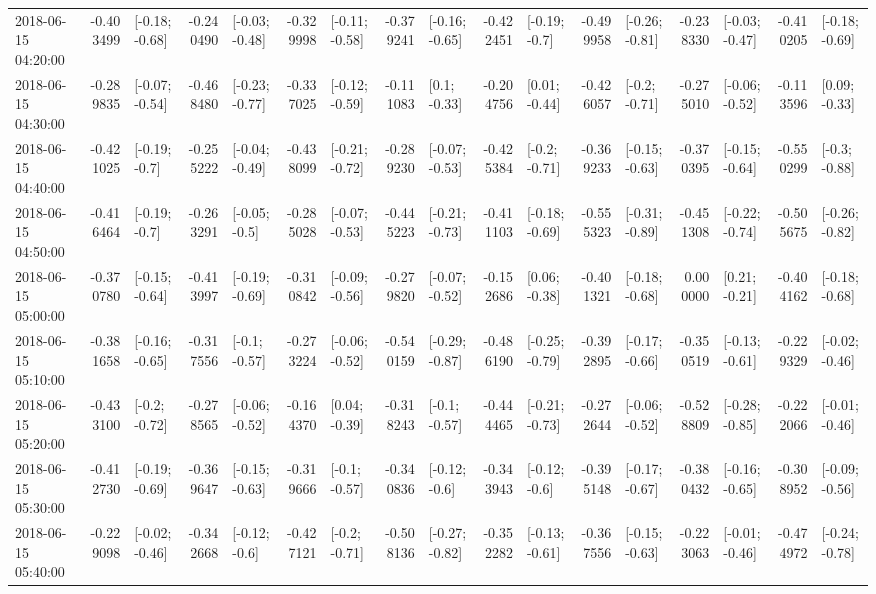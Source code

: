 \begin{tabular}{lrlrlrlrlrlrlrlrl}
2018-06-15 04:20:00 & -0.403499 &  [-0.18; -0.68] & -0.240490 &  [-0.03; -0.48] & -0.329998 &  [-0.11; -0.58] & -0.379241 &  [-0.16; -0.65] & -0.422451 &   [-0.19; -0.7] & -0.499958 &  [-0.26; -0.81] & -0.238330 &  [-0.03; -0.47] & -0.410205 &  [-0.18; -0.69] \\
2018-06-15 04:30:00 & -0.289835 &  [-0.07; -0.54] & -0.468480 &  [-0.23; -0.77] & -0.337025 &  [-0.12; -0.59] & -0.111083 &    [0.1; -0.33] & -0.204756 &   [0.01; -0.44] & -0.426057 &   [-0.2; -0.71] & -0.275010 &  [-0.06; -0.52] & -0.113596 &   [0.09; -0.33] \\
2018-06-15 04:40:00 & -0.421025 &   [-0.19; -0.7] & -0.255222 &  [-0.04; -0.49] & -0.438099 &  [-0.21; -0.72] & -0.289230 &  [-0.07; -0.53] & -0.425384 &   [-0.2; -0.71] & -0.369233 &  [-0.15; -0.63] & -0.370395 &  [-0.15; -0.64] & -0.550299 &   [-0.3; -0.88] \\
2018-06-15 04:50:00 & -0.416464 &   [-0.19; -0.7] & -0.263291 &   [-0.05; -0.5] & -0.285028 &  [-0.07; -0.53] & -0.445223 &  [-0.21; -0.73] & -0.411103 &  [-0.18; -0.69] & -0.555323 &  [-0.31; -0.89] & -0.451308 &  [-0.22; -0.74] & -0.505675 &  [-0.26; -0.82] \\
2018-06-15 05:00:00 & -0.370780 &  [-0.15; -0.64] & -0.413997 &  [-0.19; -0.69] & -0.310842 &  [-0.09; -0.56] & -0.279820 &  [-0.07; -0.52] & -0.152686 &   [0.06; -0.38] & -0.401321 &  [-0.18; -0.68] &  0.000000 &   [0.21; -0.21] & -0.404162 &  [-0.18; -0.68] \\
2018-06-15 05:10:00 & -0.381658 &  [-0.16; -0.65] & -0.317556 &   [-0.1; -0.57] & -0.273224 &  [-0.06; -0.52] & -0.540159 &  [-0.29; -0.87] & -0.486190 &  [-0.25; -0.79] & -0.392895 &  [-0.17; -0.66] & -0.350519 &  [-0.13; -0.61] & -0.229329 &  [-0.02; -0.46] \\
2018-06-15 05:20:00 & -0.433100 &   [-0.2; -0.72] & -0.278565 &  [-0.06; -0.52] & -0.164370 &   [0.04; -0.39] & -0.318243 &   [-0.1; -0.57] & -0.444465 &  [-0.21; -0.73] & -0.272644 &  [-0.06; -0.52] & -0.528809 &  [-0.28; -0.85] & -0.222066 &  [-0.01; -0.46] \\
2018-06-15 05:30:00 & -0.412730 &  [-0.19; -0.69] & -0.369647 &  [-0.15; -0.63] & -0.319666 &   [-0.1; -0.57] & -0.340836 &   [-0.12; -0.6] & -0.343943 &   [-0.12; -0.6] & -0.395148 &  [-0.17; -0.67] & -0.380432 &  [-0.16; -0.65] & -0.308952 &  [-0.09; -0.56] \\
2018-06-15 05:40:00 & -0.229098 &  [-0.02; -0.46] & -0.342668 &   [-0.12; -0.6] & -0.427121 &   [-0.2; -0.71] & -0.508136 &  [-0.27; -0.82] & -0.352282 &  [-0.13; -0.61] & -0.367556 &  [-0.15; -0.63] & -0.223063 &  [-0.01; -0.46] & -0.474972 &  [-0.24; -0.78] \\

\end{tabular}
